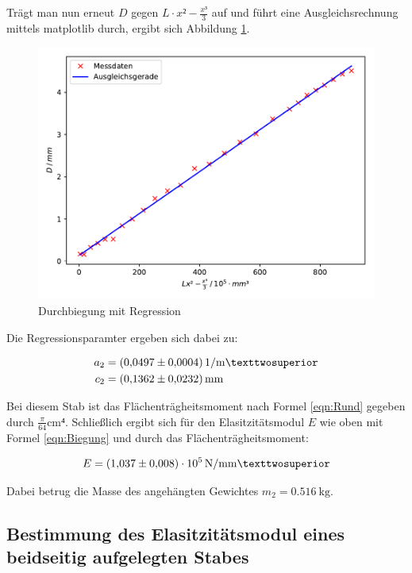 Trägt man nun erneut $D$ gegen $L\cdot x²-\frac{x³}{3}$ auf und führt eine
Ausgleichsrechnung mittels matplotlib durch, ergibt sich Abbildung \ref{fig:plot2}. 

\begin{figure}
  \centering
  \includegraphics[scale=0.8]{content/plot2.pdf}
  \caption{Durchbiegung mit Regression}
  \label{fig:plot2}
\end{figure}

Die Regressionsparamter ergeben sich dabei zu: 

\begin{align*}
a_2 &= \SI{0.0497+-0.0004}{1\per\meter²}\\ 
c_2 &= \SI{0.1362+-0.0232}{\milli\meter}
\end{align*}

Bei diesem Stab ist das Flächenträgheitsmoment nach Formel \eqref{eqn:Rund}
gegeben durch $\frac{\pi}{64}\si{\centi\meter⁴}$.
Schließlich ergibt sich für den Elasitzitätsmodul $E$ wie oben mit Formel 
\eqref{eqn:Biegung} und durch das Flächenträgheitsmoment:

\begin{equation*}
E = \SI{1.037+-0.008e5}{\newton\per\milli\meter²}
\end{equation*}

Dabei betrug die Masse des angehängten Gewichtes $m_2 = \SI{0.516}{\kilo\gram}$.

\subsection{Bestimmung des Elasitzitätsmodul eines beidseitig aufgelegten Stabes}

